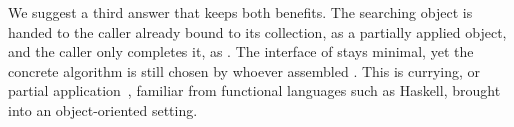 We suggest a third answer that keeps both benefits.
The searching object is handed to the caller already bound to its collection,
  as a partially applied object,
  and the caller only completes it, as .
The interface of  stays minimal,
  yet the concrete algorithm is still chosen by whoever assembled .
This is currying, or partial application~\citep{barendregt2012},
  familiar from functional languages such as Haskell,
  brought into an object-oriented setting.
